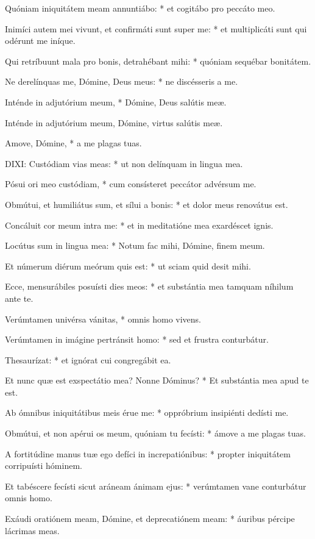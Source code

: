 Quóniam iniquitátem meam annuntiábo: * et cogitábo pro peccáto meo.

Inimíci autem mei vivunt, et confirmáti sunt super me: * et multiplicáti sunt qui odérunt me iníque.

Qui retríbuunt mala pro bonis, detrahébant mihi: * quóniam sequébar bonitátem.

Ne derelínquas me, Dómine, Deus meus: * ne discésseris a me.

Inténde in adjutórium meum, * Dómine, Deus salútis meæ.

 Inténde in adjutórium meum, Dómine, virtus salútis meæ.

 Amove, Dómine, * a me plagas tuas.


\lettrine[lines=2]{D}{IXI}: Custódiam vias meas: * ut non delínquam in lingua mea.

Pósui ori meo custódiam, * cum consísteret peccátor advérsum me.

Obmútui, et humiliátus sum, et sílui a bonis: * et dolor meus renovátus est.

Concáluit cor meum intra me: * et in meditatióne mea exardéscet ignis.

Locútus sum in lingua mea: * Notum fac mihi, Dómine, finem meum.

Et númerum diérum meórum quis est: * ut sciam quid desit mihi.

Ecce, mensurábiles posuísti dies meos: * et substántia mea tamquam níhilum ante te.

Verúmtamen univérsa vánitas, * omnis homo vivens.

Verúmtamen in imágine pertránsit homo: * sed et frustra conturbátur.

Thesaurízat: * et ignórat cui congregábit ea.

Et nunc quæ est exspectátio mea? Nonne Dóminus? * Et substántia mea apud te est.

Ab ómnibus iniquitátibus meis érue me: * oppróbrium insipiénti dedísti me.

Obmútui, et non apérui os meum, quóniam tu fecísti: * ámove a me plagas tuas.

A fortitúdine manus tuæ ego defíci in increpatiónibus: * propter iniquitátem corripuísti hóminem.

Et tabéscere fecísti sicut aráneam ánimam ejus: * verúmtamen vane conturbátur omnis homo.

Exáudi oratiónem meam, Dómine, et deprecatiónem meam: * áuribus pércipe lácrimas meas.

